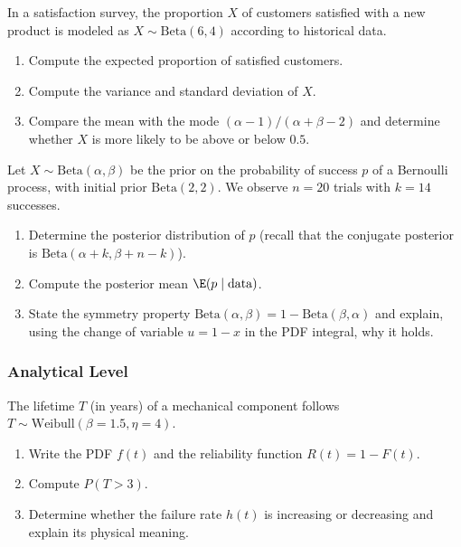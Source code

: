 \begin{problema}
	\label{prob:4.7.5}
	In a satisfaction survey, the proportion $X$ of customers satisfied with a new product is modeled as $X \sim \text{Beta}(6,4)$ according to historical data.
	\begin{enumerate}
		\item Compute the expected proportion of satisfied customers.
		\item Compute the variance and standard deviation of $X$.
		\item Compare the mean with the mode $(\alpha-1)/(\alpha+\beta-2)$ and determine whether $X$ is more likely to be above or below $0.5$.
	\end{enumerate}
\end{problema}

\begin{problema}
	\label{prob:4.7.6}
	Let $X \sim \text{Beta}(\alpha,\beta)$ be the prior on the probability of success $p$ of a Bernoulli process, with initial prior $\text{Beta}(2,2)$. We observe $n=20$ trials with $k=14$ successes.
	\begin{enumerate}
		\item Determine the posterior distribution of $p$ (recall that the conjugate posterior is $\text{Beta}(\alpha+k, \beta+n-k)$).
		\item Compute the posterior mean $\E(p \mid \text{data})$.
		\item State the symmetry property $\text{Beta}(\alpha,\beta) = 1 - \text{Beta}(\beta,\alpha)$ and explain, using the change of variable $u = 1-x$ in the PDF integral, why it holds.
	\end{enumerate}
\end{problema}

\subsubsection*{Analytical Level}

\begin{problema}
	\label{prob:4.7.7}
	The lifetime $T$ (in years) of a mechanical component follows $T \sim \text{Weibull}(\beta=1.5, \eta=4)$.
	\begin{enumerate}
		\item Write the PDF $f(t)$ and the reliability function $R(t) = 1 - F(t)$.
		\item Compute $P(T > 3)$.
		\item Determine whether the failure rate $h(t)$ is increasing or decreasing and explain its physical meaning.
	\end{enumerate}
\end{problema}

